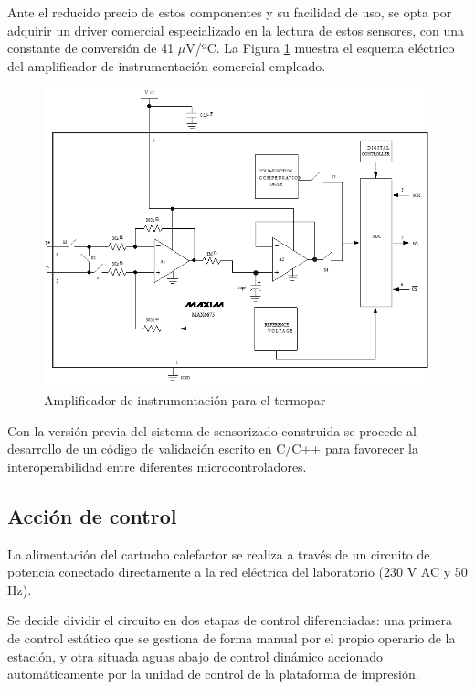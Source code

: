 Ante el reducido precio de estos componentes y su facilidad de uso, se opta por adquirir un driver comercial especializado en la lectura de estos sensores\cite{manual_termopar_driver_max6675}, con una constante de conversión de 41 $\mu$V/ºC. La Figura \ref{fig:amplificador termopar} muestra el esquema eléctrico del amplificador de instrumentación comercial empleado.

\begin{figure}[h!]
    \centering
    \includegraphics[scale=0.25]{figuras/amplificador termopar.png}
    \caption{Amplificador de instrumentación para el termopar\cite{manual_termopar_driver_max6675}}
    \label{fig:amplificador termopar}
\end{figure}

Con la versión previa del sistema de sensorizado construida se procede al desarrollo de un código de validación escrito en C/C++ para favorecer la interoperabilidad entre diferentes microcontroladores.

\subsection{Acción de control}
La alimentación del cartucho calefactor se realiza a través de un circuito de potencia conectado directamente a la red eléctrica del laboratorio (230 V AC y 50 Hz). 

Se decide dividir el circuito en dos etapas de control diferenciadas: una primera de control estático que se gestiona de forma manual por el propio operario de la estación, y otra situada aguas abajo de control dinámico accionado automáticamente por la unidad de control de la plataforma de impresión. 

